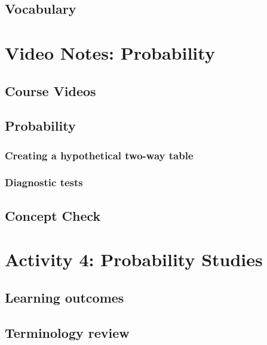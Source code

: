 \documentclass[
]{report}
\begin{document}
\subsection{Vocabulary}\label{vocabulary-1}

\section{Video Notes: Probability}\label{video-notes-probability}

\subsection{Course Videos}\label{course-videos-1}

\subsection*{Probability}\label{probability-1}

\subsubsection*{Creating a hypothetical two-way table}\label{creating-a-hypothetical-two-way-table}

\subsubsection*{Diagnostic tests}\label{diagnostic-tests}

\subsection{Concept Check}\label{concept-check-2}

\section{Activity 4: Probability Studies}\label{activity-4-probability-studies}

\subsection{Learning outcomes}\label{learning-outcomes-3}

\subsection{Terminology review}\label{terminology-review-3}
\end{document}
